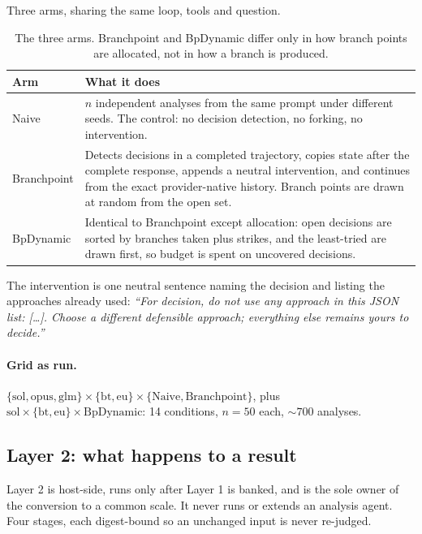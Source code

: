 \documentclass{article}
\begin{document}
Three arms, sharing the same loop, tools and question.

\begin{table}[h]
\centering
\small
\begin{tabular}{lp{9.4cm}}
\toprule
Arm & What it does \\
\midrule
Naive & $n$ independent analyses from the same prompt under different seeds. The
control: no decision detection, no forking, no intervention. \\
Branchpoint & Detects decisions in a completed trajectory, copies state after the
complete response, appends a neutral intervention, and continues from the exact
provider-native history. Branch points are drawn at random from the open set. \\
BpDynamic & Identical to Branchpoint except allocation: open decisions are
sorted by branches taken plus strikes, and the least-tried are drawn first, so
budget is spent on uncovered decisions. \\
\bottomrule
\end{tabular}
\caption{The three arms. Branchpoint and BpDynamic differ only in how branch
points are allocated, not in how a branch is produced.}
\label{tab:arms}
\end{table}

The intervention is one neutral sentence naming the decision and listing the
approaches already used: \emph{``For \textlangle decision\textrangle, do not use
any approach in this JSON list: [\ldots]. Choose a different defensible
approach; everything else remains yours to decide.''}

\paragraph{Grid as run.}
$\{\textrm{sol}, \textrm{opus}, \textrm{glm}\} \times \{\textrm{bt},
\textrm{eu}\} \times \{\textrm{Naive}, \textrm{Branchpoint}\}$, plus
$\textrm{sol} \times \{\textrm{bt}, \textrm{eu}\} \times \textrm{BpDynamic}$:
14 conditions, $n = 50$ each, ${\sim}700$ analyses.

\subsection{Layer 2: what happens to a result}
\label{sec:setup-layer2}

Layer 2 is host-side, runs only after Layer 1 is banked, and is the sole owner
of the conversion to a common scale. It never runs or extends an analysis agent.
Four stages, each digest-bound so an unchanged input is never re-judged.
\end{document}
